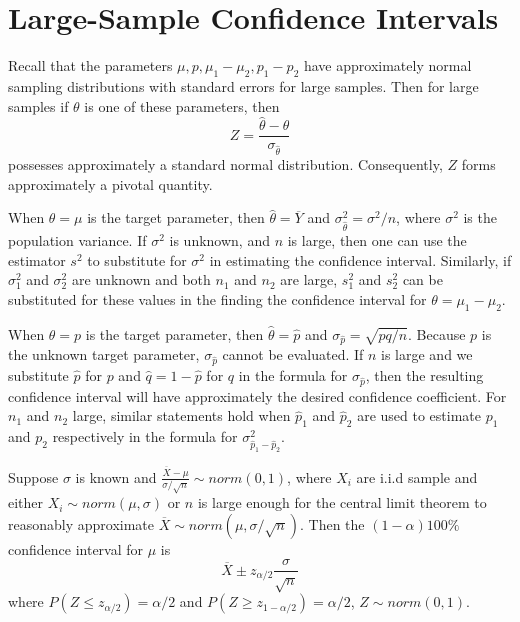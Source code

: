 \documentclass[12pt, a4paper, twoside, openright, titlepage]{book}
\begin{document}
\section{\textsection Large-Sample Confidence Intervals}

Recall that the parameters $\mu, p, \mu_1-\mu_2, p_1 - p_2$ have approximately normal sampling distributions with standard errors for large samples. Then for large samples if $\theta$ is one of these parameters, then \begin{equation*}
    Z = \frac{\hat{\theta}-\theta}{\sigma_{\hat{\theta}}}
\end{equation*}
possesses approximately a standard normal distribution. Consequently, $Z$ forms approximately a pivotal quantity.

When $\theta = \mu$ is the target parameter, then $\hat{\theta} = \overline{Y}$ and $\sigma_{\hat{\theta}}^2 = \sigma^2/n$, where $\sigma^2$ is the population variance. If $\sigma^2$ is unknown, and $n$ is large, then one can use the estimator $s^2$ to substitute for $\sigma^2$ in estimating the confidence interval. Similarly, if $\sigma_1^2$ and $\sigma_2^2$ are unknown and both $n_1$ and $n_2$ are large, $s_1^2$ and $s_2^2$ can be substituted for these values in the finding the confidence interval for $\theta = \mu_1 - \mu_2$.


When $\theta = p$ is the target parameter, then $\hat{\theta} = \hat{p}$ and $\sigma_{\hat{p}} = \sqrt{pq/n}$. Because $p$ is the unknown target parameter, $\sigma_{\hat{p}}$ cannot be evaluated. If $n$ is large and we substitute $\hat{p}$ for $p$ and $\hat{q} = 1 - \hat{p}$ for $q$ in the formula for $\sigma_{\hat{p}}$, then the resulting confidence interval will have approximately the desired confidence coefficient. For $n_1$ and $n_2$ large, similar statements hold when $\hat{p}_1$ and $\hat{p}_2$ are used to estimate $p_1$ and $p_2$ respectively in the formula for $\sigma_{\hat{p}_1 - \hat{p}_2}^2$.



\begin{prop}{}{}
    Suppose $\sigma$ is known and $\frac{\overline{X}-\mu}{\sigma/\sqrt{n}}\sim norm(0,1)$, where $X_i$ are i.i.d sample and either $X_i \sim norm(\mu,\sigma)$ or $n$ is large enough for the central limit theorem to reasonably approximate $\overline{X} \sim norm(\mu,\sigma/\sqrt{n})$. Then the $(1-\alpha)100\%$ confidence interval for $\mu$ is \begin{equation*}
        \overline{X} \pm z_{\alpha/2}\frac{\sigma}{\sqrt{n}}
    \end{equation*}
    where $P(Z\leq z_{\alpha/2}) = \alpha/2$ and $P(Z\geq z_{1-\alpha/2}) = \alpha/2$, $Z \sim norm(0,1)$.
\end{prop}
\end{document}
